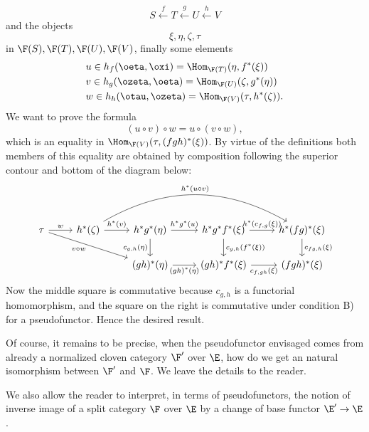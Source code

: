 \[
    S \xleftarrow{f} T \xleftarrow{g} U \xleftarrow{h} V
\]
and the objects
\[\xi, \eta, \zeta, \tau\]
in $\F (S), \F (T), \F (U), \F (V)$, finally some elements
\begin{align*}
    &u \in h_f(\oeta, \oxi) = \Hom_{\F(T)} (\eta, f^\ast(\xi))\\
    &v \in h_g(\ozeta, \oeta) = \Hom_{\F(U)} (\zeta, g^\ast(\eta))\\
    &w \in h_h(\otau, \ozeta) = \Hom_{\F(V)} (\tau, h^\ast(\zeta)).
\end{align*}
We want to prove the formula
\[(u \circ v) \circ w = u \circ (v \circ w),
\]
which is an equality in $\Hom_{\F (V)} (\tau, (fgh)^\ast(\xi))$. By virtue of the definitions both members of this equality are obtained by composition following the superior contour and bottom of the diagram below:
\[
\begin{tikzcd}
    \tau
    \arrow[r, "w"]
    \arrow[rrd, "v \circ w", swap]
    &
    h^\ast(\zeta) 
    \arrow[r, "h^\ast(v)"]
    \arrow[rrr, "h^\ast (u \circ v)", bend left]
    &
    h^\ast g^\ast(\eta)
    \arrow[r, "h^\ast g^\ast (u)"]
    \arrow[d, "c_{g,h}(\eta)", swap]
    &
    h^\ast g^\ast f^\ast (\xi)
    \arrow[r, "h^\ast (c_{f,g}(\xi))"]
    \arrow[d, "c_{g,h}(f^\ast (\xi))"]
    &
    h^\ast (fg)^\ast (\xi)
    \arrow[d, "c_{fg,h}(\xi)"]
    \\&&
    (gh)^\ast (\eta)
    \arrow[r, "(gh)^\ast (\eta)", swap]
    &
    (gh)^\ast f^\ast (\xi)
    \arrow[r, "c_{f,gh}(\xi)", swap]
    &
    (fgh)^\ast (\xi)
\end{tikzcd}\]
Now the middle square is commutative because $c_{g, h}$ is a functorial homomorphism, and
the square on the right is commutative under condition B) for a pseudofunctor.
Hence the desired result.

Of course, it remains to be precise, when the pseudofunctor envisaged comes from already a normalized cloven category $\F'$
over $\E$, how do we get an natural isomorphism between $\F'$ and $\F$. We leave the details to the reader.

We also allow the reader to interpret, in terms of pseudofunctors, the notion of inverse image of a split category $\F$ over $\E$ by a change of base functor $\E'\to \E$.
